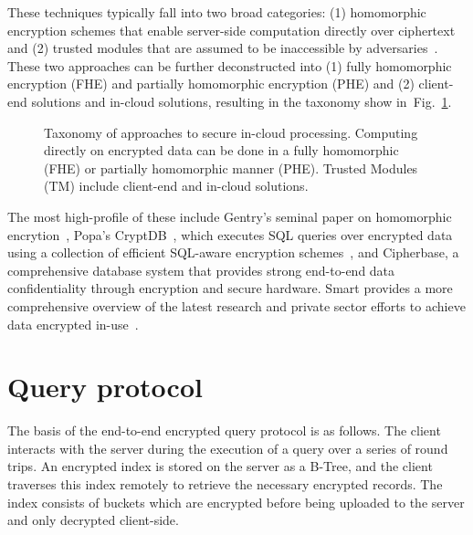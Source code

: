 \documentclass[notitlepage,longbibliography]{revtex4-1}
\newcommand{\figref}[1]{Fig.~\ref{#1}}
\begin{document}
These techniques typically fall into two broad categories: (1) homomorphic encryption schemes that enable server-side computation directly over ciphertext and (2) trusted modules that are assumed to be inaccessible by adversaries~\cite{tutorial}. These two approaches can be further deconstructed into (1) fully homomorphic encryption (FHE) and partially homomorphic encryption (PHE) and (2) client-end solutions and in-cloud solutions, resulting in the taxonomy show in~\figref{fig:taxonomy}.

\begin{figure}
	\begin{center}
	\end{center}
  \caption{Taxonomy of approaches to secure in-cloud processing.
           Computing directly on encrypted data can be done in a fully homomorphic (FHE) or partially homomorphic manner (PHE).
           Trusted Modules (TM) include client-end and in-cloud solutions.}
	\label{fig:taxonomy}
\end{figure}

The most high-profile of these include Gentry's seminal paper on homomorphic encrytion~\cite{gentry}, Popa's CryptDB~\cite{cipherbase}, which executes SQL queries
over encrypted data using a collection of efficient SQL-aware encryption schemes~\cite{cryptdb}, and Cipherbase, a comprehensive database system that provides strong end-to-end data confidentiality through encryption and secure hardware.
Smart provides a more comprehensive overview of the latest research and private sector efforts to achieve data encrypted in-use~\cite{smart}.


\section{Query protocol}

The basis of the end-to-end encrypted query protocol is as follows.
The client interacts with the server during the execution of a query over a series of round trips.
An encrypted index is stored on the server as a B-Tree, and the client traverses this index remotely to retrieve the necessary encrypted records.
The index consists of buckets which are encrypted before being uploaded to the server and only decrypted client-side.
\end{document}
